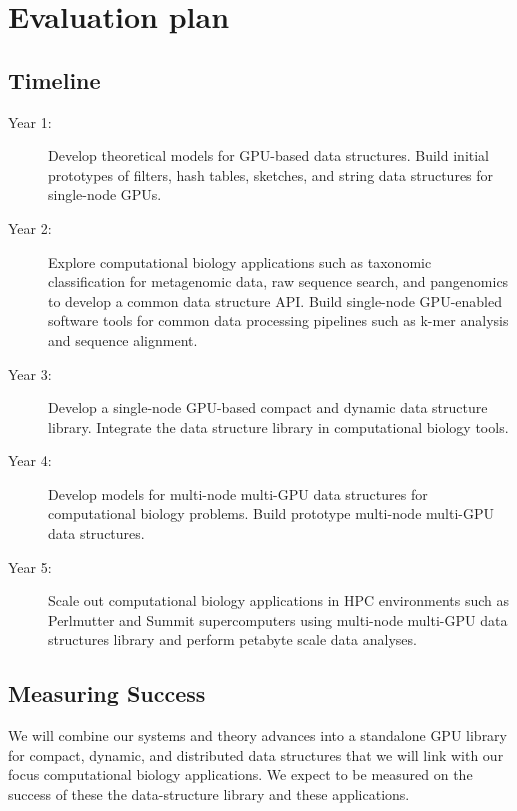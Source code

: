 \section{Evaluation plan}


\subsection{Timeline}

\begin{description}
\item [Year 1:] Develop theoretical models for GPU-based data structures. Build initial prototypes of filters, hash tables, sketches, and string data structures for single-node GPUs.

\item [Year 2:] Explore computational biology applications such as taxonomic classification for metagenomic data, raw sequence search, and pangenomics to develop a common data structure API. Build single-node GPU-enabled software tools for common data processing pipelines such as k-mer analysis and sequence alignment.

\item [Year 3:] Develop a single-node GPU-based compact and dynamic data structure library. Integrate the data structure library in computational biology tools.

\item [Year 4:] Develop models for multi-node multi-GPU data structures for computational biology problems. Build prototype multi-node multi-GPU data structures.

\item [Year 5:] Scale out computational biology applications in HPC environments such as Perlmutter and Summit supercomputers using multi-node multi-GPU data structures library and perform petabyte scale data analyses.
\end{description}



\subsection{Measuring Success} We will combine our systems and theory advances into a standalone GPU library for compact, dynamic, and distributed data structures that we will link with our focus computational biology applications. We expect to be measured on the success of these the data-structure library and these applications.

